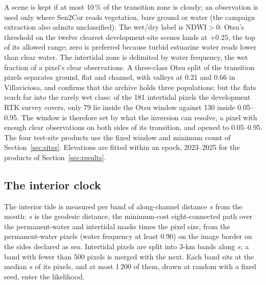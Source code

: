 A scene is kept if at most 10\,\% of the transition zone is cloudy; an
observation is used only where Sen2Cor reads vegetation, bare ground or
water (the campaign extraction also admits unclassified). The wet/dry
label is $\mathrm{NDWI} > 0$: Otsu's threshold \cite{otsu1979} on the
twelve clearest development-site scenes lands at $+0.25$, the top of its
allowed range; zero is preferred because turbid estuarine water reads
lower than clear water. The intertidal zone is delimited by water
frequency, the wet fraction of a pixel's clear observations. A
three-class Otsu split of the transition pixels separates ground, flat
and channel, with valleys at 0.21 and 0.66 in Villaviciosa, and
confirms that the archive holds three populations; but the flats reach
far into the rarely wet class: of the 181 intertidal pixels the
development RTK survey covers, only 79 lie inside the Otsu window
against 130 inside 0.05--0.95. The window is therefore set by what the
inversion
can resolve, a pixel with enough clear observations on both sides of
its transition, and opened to 0.05--0.95. The four test-site products
use the fixed window and minimum count of Section~\ref{sec:sites}. Elevations are fitted within an epoch,
2023--2025 for the products of Section~\ref{sec:results}.

\subsection{The interior clock}\label{sec:clock}

The interior tide is measured per band of along-channel distance $s$
from the mouth: $s$ is the geodesic distance, the minimum-cost
eight-connected path over the permanent-water and intertidal masks
times the pixel size, from the permanent-water pixels (water frequency
at least 0.90) on the image border on the sides declared as sea.
Intertidal pixels are split into 3-km bands along $s$; a band with fewer
than 500 pixels is merged with the next. Each band sits at the median
$s$ of its pixels, and at most 1\,200 of them, drawn at random with a
fixed seed, enter the likelihood.



